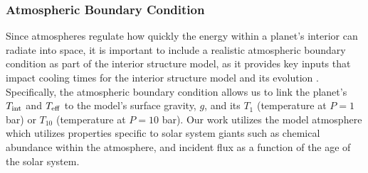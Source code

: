 \documentclass[11pt]{ucscthesisbs}
\begin{document}
\subsubsection{Atmospheric Boundary Condition}
Since atmospheres regulate how quickly the energy within a planet's interior can radiate into space, it is important to include a realistic atmospheric boundary condition as part of the interior structure model, as it provides key inputs that impact cooling times for the interior structure model and its evolution \citep{1975ApJ...199..265G,fortney_2011}. Specifically, the atmospheric boundary condition allows us to link the planet's $T_{\rm int}$ and $T_{\rm eff}$ to the model's surface gravity, $g$, and its $T_{1}$ (temperature at $P = 1$ bar) or $T_{10}$ (temperature at $P = 10$ bar). Our work utilizes the \citep{fortney_2011} model atmosphere which utilizes properties specific to solar system giants such as chemical abundance within the atmosphere, and incident flux as a function of the age of the solar system. 
\end{document}
